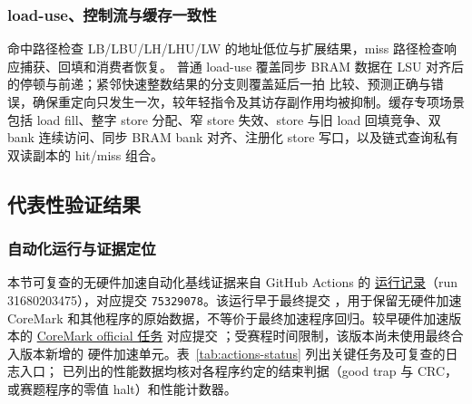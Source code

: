 \subsubsection{load-use、控制流与缓存一致性}

命中路径检查 LB/LBU/LH/LHU/LW 的地址低位与扩展结果，miss 路径检查响应捕获、回填和消费者恢复。
普通 load-use 覆盖同步 BRAM 数据在 LSU 对齐后的停顿与前递；紧邻快速整数结果的分支则覆盖延后一拍
比较、预测正确与错误，确保重定向只发生一次，较年轻指令及其访存副作用均被抑制。缓存专项场景包括
load fill、整字 store 分配、窄 store 失效、store 与旧 load 回填竞争、双 bank 连续访问、同步 BRAM
bank 对齐、注册化 store 写口，以及链式查询私有双读副本的 hit/miss 组合。

\subsection{代表性验证结果}

\subsubsection{自动化运行与证据定位}

本节可复查的无硬件加速自动化基线证据来自 GitHub Actions 的
\href{https://github.com/HanPiM/jyd/actions/runs/31680203475}{运行记录}（run 31680203475），对应提交
\texttt{75329078}。该运行早于最终提交 ，用于保留无硬件加速
CoreMark 和其他程序的原始数据，不等价于最终加速程序回归。较早硬件加速版本的
\href{https://github.com/HanPiM/jyd/actions/runs/31708291526/job/94474591976}{CoreMark official 任务}
对应提交 ；受赛程时间限制，该版本尚未使用最终合入版本新增的
硬件加速单元。表~\ref{tab:actions-status} 列出关键任务及可复查的日志入口；
已列出的性能数据均核对各程序约定的结束判据（good trap 与 CRC，或赛题程序的零值 halt）和性能计数器。

